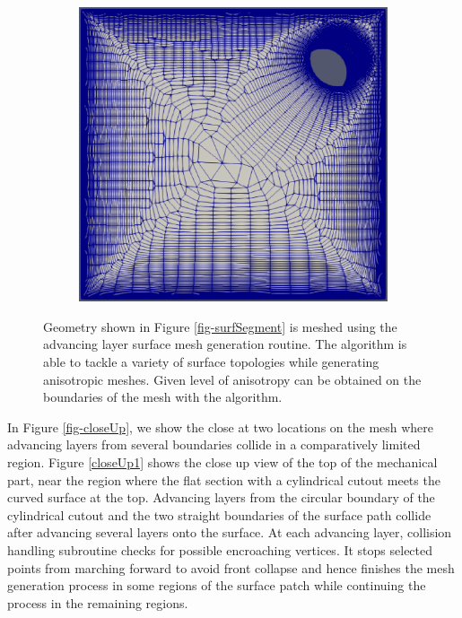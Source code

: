 \begin{figure}[hbt!]
\begin{subfigure}{0.33\textwidth}
		\includegraphics[width=0.9\linewidth]{img/r/joint-x0.004-g1.04-a5/bottom.eps}
		\caption{}
		\label{fig-joint-bottom}
	\end{subfigure}
	\caption{Geometry shown in Figure \ref{fig-surfSegment} is meshed using the advancing layer surface mesh generation routine. The algorithm is able to tackle a variety of surface topologies while generating anisotropic meshes. Given level of anisotropy can be obtained on the boundaries of the mesh with the algorithm.}
	\label{fig-joint}
\end{figure}

In Figure \ref{fig-closeUp}, we show the close at two locations on the mesh where advancing layers from several boundaries collide in a comparatively limited region. Figure \ref{closeUp1} shows the close up view of the top of the mechanical part, near the region where the flat section with a cylindrical cutout meets the curved surface at the top. Advancing layers from the circular boundary of the cylindrical cutout and the two straight boundaries of the surface path collide after advancing several layers onto the surface. At each advancing layer, collision handling subroutine checks for possible encroaching vertices. It stops selected points from marching forward to avoid front collapse and hence finishes the mesh generation process in some regions of the surface patch while continuing the process in the remaining regions.

